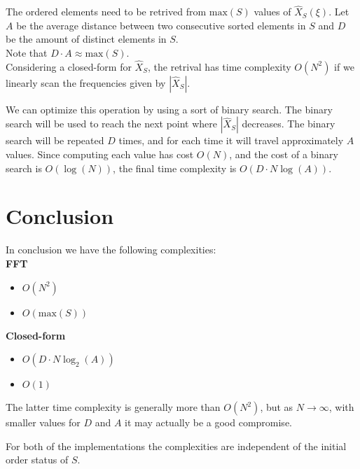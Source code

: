 \documentclass{article}
\begin{document}
The ordered elements need to be retrived from \(\text{max}(S)\) values of
\(\hat{X}_S(\xi)\). Let \(A\) be the average distance between two consecutive sorted
elements in \(S\) and \(D\) be the amount of distinct elements in \(S\).\\
Note that \(D \cdot A \approx \text{max}(S)\).
\\
Considering a closed-form for \(\hat{X}_S\), the retrival has time complexity
\(O(N^2)\) if we linearly scan the frequencies given by \(|\hat{X}_S|\).

We can optimize this operation by using a sort of binary search.
The binary search will be used to reach the next point where \(|\hat{X}_S|\) decreases.
The binary search will be repeated \(D\) times, and for each time
it will travel approximately \(A\) values. Since computing each value has cost \(O(N)\),
and the cost of a binary search is \(O(\log(N))\),
the final time complexity is \(O(D\cdot N \log(A))\).

\section{Conclusion}

In conclusion we have the following complexities: \\
\textbf{FFT}
\begin{itemize}
    \item {} \(O(N^2)\)
    \item {} \(O(\text{max}(S))\)
\end{itemize}
\textbf{Closed-form}
\begin{itemize}
    \item {} \(O(D\cdot N \log_2(A))\)
    \item {} \(O(1)\)
\end{itemize}

The latter time complexity is generally more than \(O(N^2)\),
but as \(N \to \infty\), with smaller values for \(D\) and \(A\) it may actually
be a good compromise.

For both of the implementations the complexities are independent
of the initial order status of \(S\).

\nocite{*} %

\printbibliography
\end{document}

